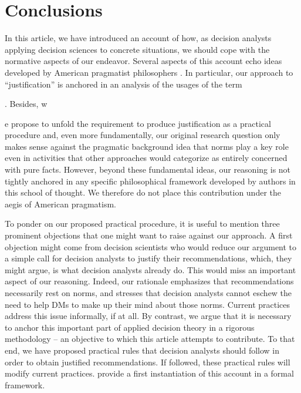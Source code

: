 \documentclass[preprint, french, english, 11pt, authoryear]{elsarticle}%
\begin{document}
\section{Conclusions}
\label{sec:concl}
In this article, we have introduced an account of how, as decision analysts applying decision sciences to concrete situations, we should cope with the normative aspects of our endeavor. %
Several aspects of this account echo ideas developed by American pragmatist philosophers \citep{ormerod_history_2006}. 
In particular, our approach to ``justification'' is anchored in an analysis of the usages of the term\begin{changebar}. Besides, w\end{changebar}e propose to unfold the requirement to produce justification as a practical procedure and, even more fundamentally, 
our original research question only makes sense against the pragmatic background idea that norms play a key role even in activities that other approaches would categorize as entirely concerned with pure facts.
However, beyond these fundamental ideas, our reasoning is not tightly anchored in any specific philosophical framework developed by authors in this school of thought.
We therefore do not place this contribution under the aegis of American pragmatism.


To ponder on our proposed practical procedure, it is useful to mention three prominent objections that one might want to raise against our approach. A first objection might come from decision scientists who would reduce our argument to a simple call for decision analysts to justify their recommendations, which, they might argue, is what decision analysts already do. This would miss an important aspect of our reasoning. Indeed, our rationale emphasizes that recommendations necessarily rest on norms, and stresses that decision analysts cannot eschew the need to help \acp{DM}
 to make up their mind about those norms. Current practices address this issue informally, if at all. By contrast, we argue that it is necessary to anchor this important part of applied decision theory in a rigorous methodology -- an objective to which this article attempts to contribute. To that end, we have proposed practical rules that decision analysts should follow in order to obtain justified recommendations. If followed, these practical rules will modify current practices. \citet{cailloux_formal_2018} provide a first instantiation of this account in a formal framework.
\end{document}
